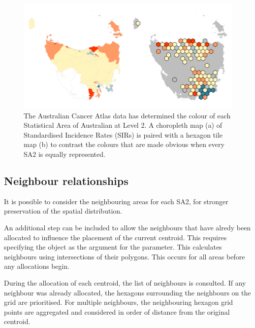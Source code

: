 \documentclass[
]{jss}
\begin{document}
\begin{CodeChunk}
\begin{figure}

{\centering \includegraphics[width=1\linewidth]{figures/7SIR} 

}

\caption[The Australian Cancer Atlas data has determined the colour of each Statistical Area of Australian at Level 2]{The Australian Cancer Atlas data has determined the colour of each Statistical Area of Australian at Level 2. A choropleth map (a) of Standardised Incidence Rates (SIRs) is paired with a hexagon tile map (b) to contrast the colours that are made obvious when every SA2 is equally represented.}\label{fig:sir}
\end{figure}
\end{CodeChunk}

\hypertarget{neighbour-relationships}{%
\subsection{Neighbour relationships}\label{neighbour-relationships}}

It is possible to consider the neighbouring areas for each SA2, for
stronger preservation of the spatial distribution.

An additional step can be included to allow the neighbours that have
alredy been allocated to influence the placement of the current
centroid. This requires specifying the  object as the argument
for the  parameter. This calculates neighbours
using intersections of their polygons. This occurs for all areas before
any allocations begin.

During the allocation of each centroid, the list of neighbours is
consulted. If any neighbour was already allocated, the hexagons
surrounding the neighbours on the grid are prioritised. For multiple
neighbours, the neighbouring hexagon grid points are aggregated and
considered in order of distance from the original centroid.
\end{document}
